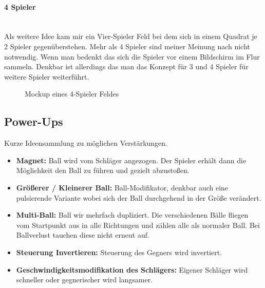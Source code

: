 \paragraph{4 Spieler}
\mbox{}\\
Als weitere Idee kam mir ein Vier-Spieler Feld bei dem sich in einem Quadrat je 2 Spieler gegenüberstehen.
\newline
Mehr als 4 Spieler sind meiner Meinung nach nicht notwendig. Wenn man bedenkt das sich die Spieler vor einem Bildschirm im Flur sammeln.
\newline
Denkbar ist allerdings das man das Konzept für 3 und 4 Spieler für weitere Spieler weiterführt.
\begin{figure}[ht]
	\begin{center}
	\end{center}
	\caption{Mockup eines 4-Spieler Feldes}
	\label{figx}
\end{figure}
\newpage
\subsection{Power-Ups}
Kurze Ideensammlung zu möglichen Verstärkungen.
\begin{itemize}
	\item
	      \textbf{Magnet:} Ball wird vom Schläger angezogen. Der Spieler erhält dann die Möglichkeit den Ball zu führen und gezielt abzustoßen.
	\item
	      \textbf{Größerer / Kleinerer Ball:} Ball-Modifikator, denkbar auch eine pulsierende Variante wobei sich der Ball durchgehend in der Größe verändert.
	\item
	      \textbf{Multi-Ball:} Ball wir mehrfach dupliziert. Die verschiedenen Bälle fliegen vom Startpunkt aus in alle Richtungen und zählen alle als normaler Ball. Bei Ballverlust tauchen diese nicht erneut auf.
	\item
	      \textbf{Steuerung Invertieren:} Steuerung des Gegners wird invertiert.
	\item
	      \textbf{Geschwindigkeitsmodifikation des Schlägers:} Eigener Schläger wird schneller oder gegnerischer wird langsamer.
\end{itemize}
